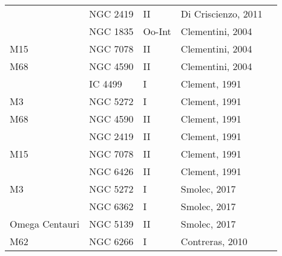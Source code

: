 \documentclass[]{article}
\begin{document}
\begin{longtable}{
	p{1.5cm}|
	p{2.5cm}|
	p{2.5cm}|
	p{3.7cm}|
	p{5.5cm}
	@{}}
		& NGC 2419     & II         & Di Criscienzo, 2011 \cite{di_criscienzo_2011_a}  &                                                                        \\
		& NGC 1835     & Oo-Int     & Clementini, 2004 \cite{clementini_2004}     &                                                                        \\
		M15            & NGC 7078     & II         & Clementini, 2004     &                                                                        \\
		M68            & NGC 4590     & II         & Clementini, 2004     &                                                                        \\
		& IC 4499      & I          & Clement, 1991 \cite{clement_1991_a}        &                                                                        \\
		M3             & NGC 5272     & I          & Clement, 1991        &                                                                        \\
		M68            & NGC 4590     & II         & Clement, 1991        &                                                                        \\
		& NGC 2419     & II         & Clement, 1991        &                                                                        \\
		M15            & NGC 7078     & II         & Clement, 1991        &                                                                        \\
		& NGC 6426     & II         & Clement, 1991        &                                                                        \\
		M3             & NGC 5272     & I          & Smolec, 2017 \cite{smolec_2017}         &                                                                        \\
		& NGC 6362     & I          & Smolec, 2017         &                                                                        \\
		Omega Centauri & NGC 5139     & II         & Smolec, 2017         &                                                                        \\
		M62            & NGC 6266     & I          & Contreras, 2010 \cite{contreras_2010}      &                                                                        \\

\end{longtable}
\end{document}
